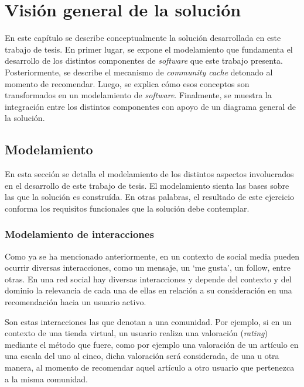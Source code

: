 
\chapter{Visión general de la solución}
\label{cap:vision}
En este capítulo se describe conceptualmente la solución desarrollada en este trabajo de tesis. En primer lugar, se expone el modelamiento que fundamenta el desarrollo de los distintos componentes de \textit{software} que este trabajo presenta. Posteriormente, se describe el mecanismo de \textit{community \textit{cache}} detonado al momento de recomendar. Luego, se explica cómo esos conceptos son transformados en un modelamiento de \textit{software}.  Finalmente, se muestra la integración entre los distintos componentes con apoyo de un diagrama general de la solución.

\section{Modelamiento}
\label{vision:redes}

En esta sección se detalla el modelamiento de los distintos aspectos involucrados en el desarrollo de este trabajo de tesis. El modelamiento sienta las bases sobre las que la solución es construída. En otras palabras, el resultado de este ejercicio conforma los requisitos funcionales que la solución debe contemplar. 

\subsection{Modelamiento de interacciones}

Como ya se ha mencionado anteriormente, en un contexto de social media pueden ocurrir diversas interacciones, como un mensaje, un ‘me gusta’, un follow, entre otras. En una red social hay diversas interacciones y depende del contexto y del dominio la relevancia de cada una de ellas en relación a su consideración en una recomendación hacia un usuario activo.

Son estas interacciones las que denotan a una comunidad. Por ejemplo, si en un contexto de una tienda virtual, un usuario realiza una valoración (\textit{rating}) mediante el método que fuere, como por ejemplo una valoración de un artículo en una escala del uno al cinco, dicha valoración será considerada, de una u otra manera, al momento de recomendar aquel artículo a otro usuario que pertenezca a la misma comunidad.

